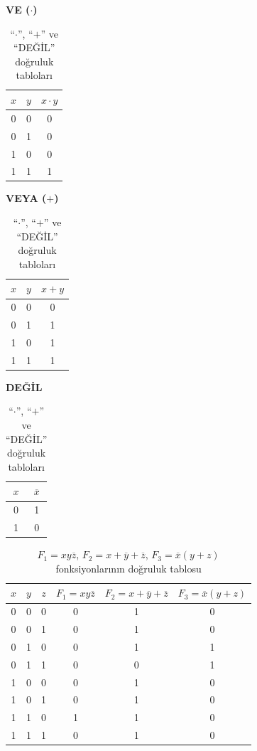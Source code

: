 \begin{table}[H]
\centering
\caption{``$\cdot$'', ``$+$'' ve ``DEĞİL'' doğruluk tabloları}
\label{tab:B.2}
\begin{minipage}{0.3\textwidth}
\centering
\textbf{VE ($\cdot$)}
\vspace{0.3em}

\begin{tabular}{cc|c}
\toprule
$x$ & $y$ & $x \cdot y$ \\
\midrule
0 & 0 & 0 \\
0 & 1 & 0 \\
1 & 0 & 0 \\
1 & 1 & 1 \\
\bottomrule
\end{tabular}
\end{minipage}
\hfill
\begin{minipage}{0.3\textwidth}
\centering
\textbf{VEYA ($+$)}
\vspace{0.3em}

\begin{tabular}{cc|c}
\toprule
$x$ & $y$ & $x + y$ \\
\midrule
0 & 0 & 0 \\
0 & 1 & 1 \\
1 & 0 & 1 \\
1 & 1 & 1 \\
\bottomrule
\end{tabular}
\end{minipage}
\hfill
\begin{minipage}{0.3\textwidth}
\centering
\textbf{DEĞİL}
\vspace{0.3em}

\begin{tabular}{c|c}
\toprule
$x$ & $\overline{x}$ \\
\midrule
0 & 1 \\
1 & 0 \\
\bottomrule
\end{tabular}
\end{minipage}
\end{table}

\begin{table}[H]
\centering
\caption{$F_1 = x y \overline{z}$, $F_2 = x + \overline{y} + \overline{z}$, $F_3 = \overline{x}(y + z)$ fonksiyonlarının doğruluk tablosu}
\label{tab:B.3}
\begin{tabular}{ccc|ccc}
\toprule
$x$ & $y$ & $z$ & $F_1 = x y \overline{z}$ & $F_2 = x + \overline{y} + \overline{z}$ & $F_3 = \overline{x}(y + z)$ \\
\midrule
0 & 0 & 0 & 0 & 1 & 0 \\
0 & 0 & 1 & 0 & 1 & 0 \\
0 & 1 & 0 & 0 & 1 & 1 \\
0 & 1 & 1 & 0 & 0 & 1 \\
1 & 0 & 0 & 0 & 1 & 0 \\
1 & 0 & 1 & 0 & 1 & 0 \\
1 & 1 & 0 & 1 & 1 & 0 \\
1 & 1 & 1 & 0 & 1 & 0 \\
\bottomrule
\end{tabular}
\end{table}


